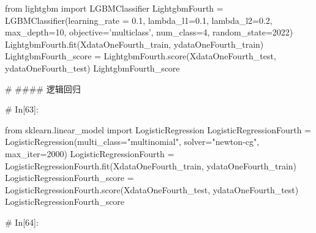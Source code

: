\documentclass{MathorCupmodeling}
\begin{document}
\begin{python}
from lightgbm import LGBMClassifier
LightgbmFourth = LGBMClassifier(learning_rate = 0.1,
                                lambda_l1=0.1,
                                lambda_l2=0.2,
                                max_depth=10,
                                objective='multiclass',
                                num_class=4,
                                random_state=2022)
LightgbmFourth.fit(XdataOneFourth_train, ydataOneFourth_train)
LightgbmFourth_score = LightgbmFourth.score(XdataOneFourth_test, ydataOneFourth_test)
LightgbmFourth_score


# #### 逻辑回归

# In[63]:


from sklearn.linear_model import LogisticRegression
LogisticRegressionFourth = LogisticRegression(multi_class="multinomial", solver="newton-cg", max_iter=2000)
LogisticRegressionFourth = LogisticRegressionFourth.fit(XdataOneFourth_train, ydataOneFourth_train)
LogisticRegressionFourth_score = LogisticRegressionFourth.score(XdataOneFourth_test, ydataOneFourth_test)
LogisticRegressionFourth_score


# In[64]:



\end{python}
\end{document}
